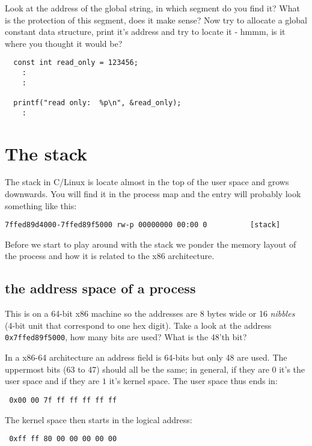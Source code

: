 \documentclass[a4paper,11pt]{article}
\begin{document}
Look at the address of the global string, in which segment do you find
it? What is the protection of this segment, does it make sense? Now
try to allocate a global constant data structure, print it's address
and try to locate it - hmmm, is it where you thought it would be?


\begin{lstlisting}
  const int read_only = 123456;
    :
    :
    
  printf("read only:  %p\n", &read_only);
    :  
\end{lstlisting}

\section{The stack}

The stack in C/Linux is locate almost in the top of the user space and
grows downwards. You will find it in the process map and the entry
will probably look something like this:

\begin{verbatim}
7ffed89d4000-7ffed89f5000 rw-p 00000000 00:00 0          [stack]
\end{verbatim}

Before we start to play around with the stack we ponder the memory
layout of the process and how it is related to the x86 architecture. 


\subsection{the address space of a process}
  
This is on a 64-bit x86 machine so the addresses are 8 bytes wide or
16 {\em nibbles} (4-bit unit that correspond to one hex digit). Take a
look at the address {\tt 0x7ffed89f5000}, how many bits are used? What is
the 48'th bit?

In a x86-64 architecture an address field is 64-bits but only 48 are
used. The uppermost bits (63 to 47) should all be the same; in general, if they
are $0$ it's the user space and if they are $1$ it's kernel space. The
user space thus ends in:

\begin{verbatim}
 0x00 00 7f ff ff ff ff ff
\end{verbatim}


The kernel space then starts in the logical address:

\begin{verbatim}
 0xff ff 80 00 00 00 00 00
\end{verbatim}
\end{document}
